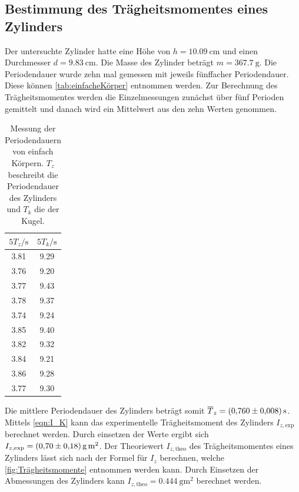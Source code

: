 \subsection{Bestimmung des Trägheitsmomentes eines Zylinders}
\label{subsec:A_zylinder}
Der untersuchte Zylinder hatte eine Höhe von $h = \qty{10.09}{\centi\metre}$ und einen Durchmesser $d = \qty{9.83}{\centi\metre}$. Die Masse des Zylinder beträgt $m = \qty{367.7}{\gram}$.
Die Periodendauer wurde zehn mal gemessen mit jeweils fünffacher Periodendauer. Diese können \autoref{tab:einfacheKörper} entnommen werden. Zur Berechnung des Trägheitsmomentes werden die Einzelmessungen zunächst über 
fünf Perioden gemittelt und danach wird ein Mittelwert aus den zehn Werten genommen.
\begin{table}
    \centering
    \caption{Messung der Periodendauern von einfach Körpern. $T_z$ beschreibt die Periodendauer des Zylinders und $T_k$ die der Kugel.} 
    \label{tab:einfacheKörper}
    \begin{tabular}{c c}
        \toprule
        $\unit{{5}T_{z}\per\second}$ & $\unit{{5}T_k\per\second}$ \\
        \midrule
        3.81 & 9.29 \\
        3.76 & 9.20 \\
        3.77 & 9.43 \\
        3.78 & 9.37 \\
        3.74 & 9.24 \\
        3.85 & 9.40 \\
        3.82 & 9.32 \\
        3.84 & 9.21 \\
        3.86 & 9.28 \\
        3.77 & 9.30 \\
        \bottomrule 
    \end{tabular}
\end{table}
Die mittlere Periodendauer des Zylinders beträgt somit $\overline{T}_z = \qty{0.760+-0.008}{\second}$.
Mittels \autoref{eqn:I_K} kann das experimentelle Trägheitsmoment des Zylinders $I_{z,\text{exp}}$ berechnet werden. Durch einsetzen der Werte ergibt sich $I_{z,\text{exp}} = \qty{0.70+-0.18}{\gram\metre\squared}$.
Der Theoriewert $I_{z,\text{theo}}$ des Trägheitsmomentes eines Zylinders lässt sich nach der Formel für $I_z$ berechnen, welche \autoref{fig:Trägheitsmomente} entnommen werden kann.
Durch Einsetzen der Abmessungen des Zylinders kann $I_{z,\text{theo}} = \qty{0.444}{\gram\metre\squared}$ berechnet werden.
